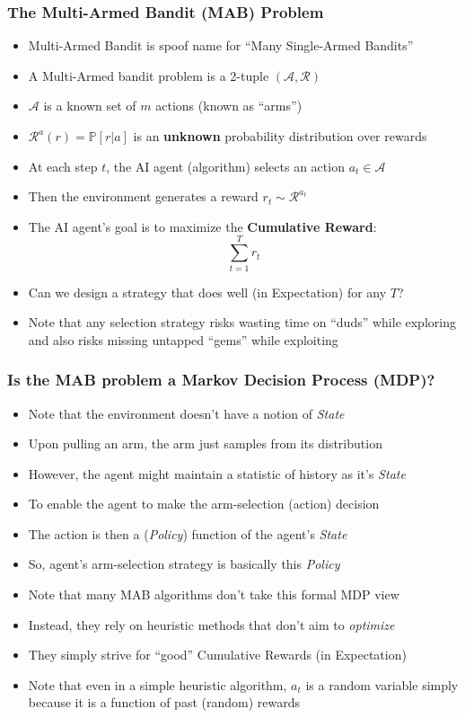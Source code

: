 \documentclass[handout]{beamer}
\begin{document}
\begin{frame}
\frametitle{The Multi-Armed Bandit (MAB) Problem}
\pause
\begin{itemize}[<+->]
\item Multi-Armed Bandit is spoof name for ``Many Single-Armed Bandits''
\item A Multi-Armed bandit problem is a 2-tuple $(\mathcal{A}, \mathcal{R})$
\item $\mathcal{A}$ is a known set of $m$ actions (known as ``arms'')
\item $\mathcal{R}^a(r) = \mathbb{P}[r|a]$ is an {\bf unknown} probability distribution over rewards
\item At each step $t$, the AI agent (algorithm) selects an action $a_t \in \mathcal{A}$
\item Then the environment generates a reward $r_t \sim \mathcal{R}^{a_t}$
\item The AI agent's goal is to maximize the {\bf Cumulative Reward}:
$$\sum_{t=1}^T r_t$$
\item Can we design a strategy that does well (in Expectation) for any $T$?
\item Note that any selection strategy risks wasting time on ``duds'' while exploring and also risks missing untapped ``gems'' while exploiting
\end{itemize}
\end{frame}

\begin{frame}
\frametitle{Is the MAB problem a Markov Decision Process (MDP)?}
\pause
\begin{itemize}[<+->]
\item Note that the environment doesn't have a notion of {\em State}
\item Upon pulling an arm, the arm just samples from its distribution
\item However, the agent might maintain a statistic of history as it's {\em State}
\item To enable the agent to make the arm-selection (action) decision
\item The action is then a ({\em Policy}) function of the agent's {\em State}
\item So, agent's arm-selection strategy is basically this {\em Policy}
\item Note that many MAB algorithms don't take this formal MDP view
\item Instead, they rely on heuristic methods that don't aim to {\em optimize}
\item They simply strive for ``good'' Cumulative Rewards (in Expectation) 
\item Note that even in a simple heuristic algorithm, $a_t$ is a random variable
simply because it is a function of past (random) rewards
\end{itemize}
\end{frame}
\end{document}
